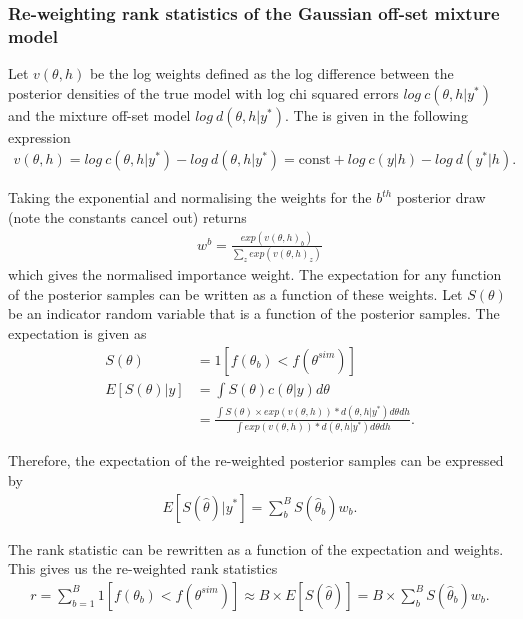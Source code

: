 \documentclass[12pt, a4paper]{article}
\begin{document}
    \subsubsection{Re-weighting rank statistics of the Gaussian off-set mixture model}
    Let $v(\theta, h)$ be the log weights defined as the log difference between the posterior densities of the true model with log chi squared errors $log\: c(\theta, h | y^{\ast})$ and the mixture off-set model $log\:  d(\theta, h | y^{\ast})$. The is given in the following expression
    \begin{align}
        v(\theta, h) = log\: c(\theta, h | y^{\ast}) - log\:  d(\theta, h | y^{\ast}) = \text{const} + log\: c(y|h) - log\: d(y^{\ast} | h).
    \end{align}

    Taking the exponential and normalising the weights for the $b^{th}$ posterior draw (note the constants cancel out) returns
    \begin{align}
    w^b = \frac{exp(v(\theta, h)_b)}{\sum_z exp(v(\theta, h)_z)}
    \end{align}
    which gives the normalised importance weight. The expectation for any function of the posterior samples can be written as a function of these weights. Let $S(\theta)$ be an indicator random variable that is a function of the posterior samples. The expectation is given as
    \begin{align}
    S(\theta) &= 1[f(\theta_b) < f(\theta^{sim})] \\
    E[S(\theta) | y] &= \int S(\theta) c(\theta | y) d\theta\\ 
    &= \frac{\int S(\theta)\times exp(v(\theta, h)) * d(\theta, h | y^{\ast})d\theta d h}{\int exp(v(\theta, h)) * d(\theta, h | y^{\ast})d\theta d h}.
    \end{align}
    
    Therefore, the expectation of the re-weighted posterior samples can be expressed by
    \begin{align}
    E[S(\hat{\theta}) | y^{\ast}] = \sum_b^B S(\hat{\theta}_b)w_b.
    \end{align}

    The rank statistic can be rewritten as a function of the expectation and weights. This gives us the re-weighted rank statistics
    \begin{align}
    r = \sum_{b=1}^{B}1[f(\theta_{b}) < f(\theta^{sim})] \approx  B\times E[S(\hat{\theta})] = B\times \sum_b^B S(\hat{\theta}_b)w_b.
    \end{align}
\end{document}
